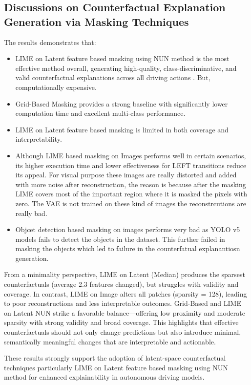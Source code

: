\subsection{Discussions on Counterfactual Explanation Generation via
Masking Techniques}
The results demonstrates that:
\begin{itemize}
    \item LIME on Latent feature based masking using NUN method is the most effective method overall, generating high-quality, class-discriminative, and valid counterfactual explanations across all driving actions . But, computationally expensive.
    \item Grid-Based Masking provides a strong baseline with significantly lower computation time and excellent multi-class performance.
    \item LIME on Latent feature based masking is limited in both coverage and interpretability.
    \item Although LIME based masking on Images performs well in certain scenarios, its higher execution time and lower effectiveness for LEFT transitions reduce its appeal. For visual purpose these images are really distorted and added with more noise after reconstruction, the reason is because after the masking LIME covers most of the important region where it is masked the pixels with zero. The VAE is not trained on these kind of images the reconstrcutions are really bad.
    \item Objcet detection based masking on images performs very bad as YOLO v5 models fails to detect the objects in the dataset. This further failed in masking the objects which led to failure in the counterfatual explanantiosn generation. 
\end{itemize}

From a minimality perspective, LIME on Latent (Median) produces the sparsest counterfactuals (average 2.3 features changed), but struggles with validity and coverage. In contrast, LIME on Image alters all patches (sparsity = 128), leading to poor reconstructions and less interpretable outcomes. Grid-Based and LIME on Latent NUN strike a favorable balance—offering low proximity and moderate sparsity with strong validity and broad coverage. This highlights that effective counterfactuals should not only change predictions but also introduce minimal, semantically meaningful changes that are interpretable and actionable.

These results strongly support the adoption of latent-space counterfactual techniques particularly LIME on Latent feature based masking using NUN method for enhanced explainability in autonomous driving models.





